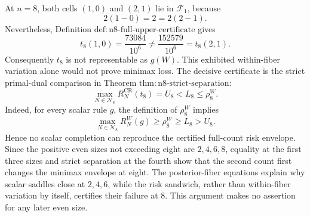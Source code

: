 At \(n=8\), both cells \((1,0)\) and \((2,1)\) lie in \(\mathcal F_1\), because
\[
 2(1-0)=2=2(2-1).
\]
Nevertheless, Definition
\(\mathrm{def{:}n8\mbox{-}full\mbox{-}upper\mbox{-}certificate}\)
gives
\[
 t_8(1,0)=\frac{73084}{10^6}
 \neq
 \frac{152579}{10^6}=t_8(2,1).
\]
Consequently \(t_8\) is not representable as \(g(W)\).  This exhibited within-fiber variation alone would not prove minimax loss.  The decisive certificate is the strict primal-dual comparison in Theorem
\(\mathrm{thm{:}n8\mbox{-}strict\mbox{-}separation}\):
\[
 \max_{N\in\mathcal N_8}R_N^{\mathrm{CR}}(t_8)
 =U_8<L_8\leq\rho_8^W.
\]
Indeed, for every scalar rule \(g\), the definition of \(\rho_8^W\) implies
\[
 \max_{N\in\mathcal N_8}R_N^W(g)
 \geq\rho_8^W
 \geq L_8
 >U_8.
\]
Hence no scalar completion can reproduce the certified full-count risk envelope.  Since the positive even sizes not exceeding eight are \(2,4,6,8\), equality at the first three sizes and strict separation at the fourth show that the second count first changes the minimax envelope at eight.  The posterior-fiber equations explain why scalar saddles close at \(2,4,6\), while the risk sandwich, rather than within-fiber variation by itself, certifies their failure at \(8\).  This argument makes no assertion for any later even size.
